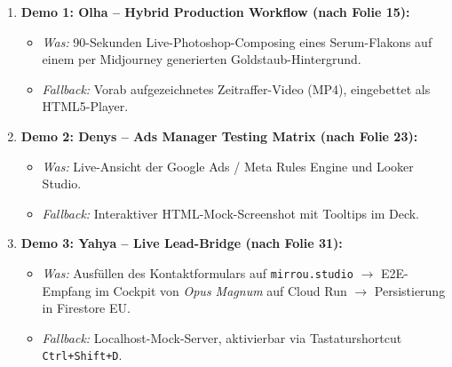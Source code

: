 \documentclass[11pt,a4paper]{article}
\begin{document}
\begin{enumerate}
    \item \textbf{Demo 1: Olha -- Hybrid Production Workflow (nach Folie 15):}
    \begin{itemize}
        \item \textit{Was:} 90-Sekunden Live-Photoshop-Composing eines Serum-Flakons auf einem per Midjourney generierten Goldstaub-Hintergrund.
        \item \textit{Fallback:} Vorab aufgezeichnetes Zeitraffer-Video (MP4), eingebettet als HTML5-Player.
    \end{itemize}
    
    \item \textbf{Demo 2: Denys -- Ads Manager Testing Matrix (nach Folie 23):}
    \begin{itemize}
        \item \textit{Was:} Live-Ansicht der Google Ads / Meta Rules Engine und Looker Studio.
        \item \textit{Fallback:} Interaktiver HTML-Mock-Screenshot mit Tooltips im Deck.
    \end{itemize}
    
    \item \textbf{Demo 3: Yahya -- Live Lead-Bridge (nach Folie 31):}
    \begin{itemize}
        \item \textit{Was:} Ausfüllen des Kontaktformulars auf \texttt{mirrou.studio} $\rightarrow$ E2E-Empfang im Cockpit von \textit{Opus Magnum} auf Cloud Run $\rightarrow$ Persistierung in Firestore EU.
        \item \textit{Fallback:} Localhost-Mock-Server, aktivierbar via Tastaturshortcut \texttt{Ctrl+Shift+D}.
    \end{itemize}
\end{enumerate}

\end{document}
